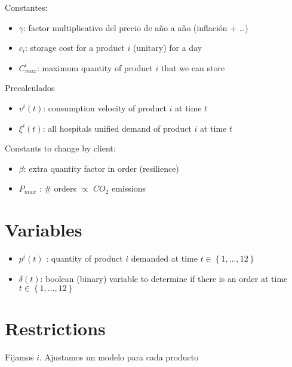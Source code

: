 \documentclass[a4paper]{article}
\theoremstyle{definition}
\begin{document}
\vspace{5mm}

Constantes:
\begin{itemize}
	\item $\gamma$: factor multiplicativo del precio de año a año (inflación + \ldots)
	\item $c_i$: storage cost for a product  $i$ (unitary) for a day
	\item $C_{max}^{i}$: maximum quantity of product $i$ that we can store
\end{itemize}


\vspace{5mm}

Precalculados
\begin{itemize}
\item  $v^{i}\left( t \right) $: consumption velocity of product $i$ at time  $t$
\item $\xi^{i}\left( t \right) $: all hospitals unified demand of product $i$ at time  $t$
\end{itemize}

\vspace{5mm}


Constants to change by client:
\begin{itemize}
	\item $\beta$: extra quantity factor in order (resilience)
	\item  $P_{max}$ : $\#$ orders \quad  $\propto$ \quad $CO_2$ emissions
\end{itemize}


\newpage
\section{Variables}
\begin{itemize}
	\item $p^{i}\left( t \right) $ : quantity of product $i$ demanded at time  $t \in \left\{ 1,\ldots,12 \right\} $
	\item  $\delta\left( t \right) $: boolean (binary) variable to determine if there is an order at time $t \in \left\{ 1,\ldots,12 \right\} $
\end{itemize}

\vspace{15mm}

\section{Restrictions}

\begin{remark}
Fijamos $i$. Ajustamos un modelo para cada producto
\end{remark}
\end{document}
